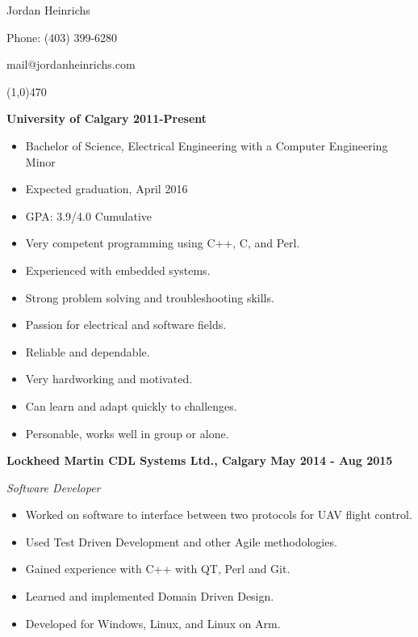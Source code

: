 \documentclass[12pt]{article} %
\begin{document}

\centerline{{\Huge \sc Jordan Heinrichs}}  %
\centerline{Phone: (403) 399-6280} %
\centerline{mail@jordanheinrichs.com}
\noindent
\line(1,0){470}\\

\medskip

  \bigskip
{}
\medskip

\noindent \centerline{ \bf University of Calgary \hfill 2011-Present}
\begin{itemize}[parsep=0pt,partopsep=0pt]
  \item Bachelor of Science, Electrical Engineering with a Computer Engineering Minor
  \item Expected graduation, April 2016
  \item GPA: 3.9/4.0 Cumulative
\end{itemize}

\bigskip
{} 
\medskip
\begin{itemize}
\item Very competent programming using C++, C, and Perl. 
\item Experienced with embedded systems.
\item Strong problem solving and troubleshooting skills.
\item Passion for electrical and software fields.
\bigskip
\item Reliable and dependable. 
\item Very hardworking and motivated.
\item Can learn and adapt quickly to challenges.
\item Personable, works well in group or alone.
\end{itemize}
\noindent %


\bigskip
{} 
\medskip

\noindent \centerline{ \bf Lockheed Martin CDL Systems Ltd., Calgary \hfill May 2014 - Aug 2015}
\indent \emph{ Software Developer } 
\begin{itemize}
  \item Worked on software to interface between two protocols for UAV flight control.
  \item Used Test Driven Development and other Agile methodologies.
  \item Gained experience with C++ with QT, Perl and Git.
  \item Learned and implemented Domain Driven Design.
  \item Developed for Windows, Linux, and Linux on Arm.
\end{itemize}
\end{document}
